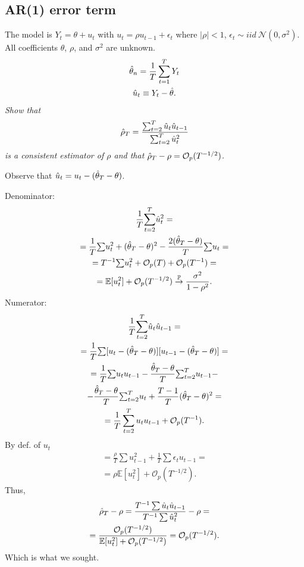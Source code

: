 \documentclass[9pt]{extarticle}
\newcommand{\PP}{\mathbb{P}}
\newcommand{\EE}{\mathbb{E}}
\newcommand{\OO}{\mathcal{O}}
\newcommand{\parrow}{\overset{\PP}{\rightarrow}}
\begin{document}
\begin{multicols*}{4}
\subsection*{AR(1) error term}
The model is $Y_t = \theta + u_t$ with $u_t = \rho u_{t-1} + \epsilon_t$ where $|\rho| < 1$, $\epsilon_t \sim iid ~\mathcal{N}(0, \sigma^2)$. All coefficients $\theta$, $\rho$, and $\sigma^2$ are unknown.
\begin{gather*}
    \hat{\theta}_n = \frac{1}{T}\sum_{t=1}^T Y_t \\
    \hat{u}_t \equiv Y_t - \hat{\theta}.
\end{gather*}
\emph{Show that}
\begin{gather*}
    \hat{\rho}_T = \frac{\sum_{t=2}^T \hat{u}_t \hat{u}_{t-1}}{\sum_{t=2}^T \hat{u}_t^2}
\end{gather*}
\emph{is a consistent estimator of $\rho$ and that $\hrho_T - \rho = \OO_p(T^{-1/2})$.}

Observe that $\hat{u}_t = u_t - (\hat{\theta}_T - \theta)$.

Denominator:
\begin{gather*}
    \frac{1}{T}{ \sum_{t=2}^T} \hu_t^2 = \\
    = \frac{1}{T}{\textstyle \sum} u_t^2 + (\htt_T - \theta)^2 - \frac{2(\htt_T - \theta)}{T}{\textstyle \sum} u_t = \\
    = T^{-1}{\textstyle \sum} u_t^2 + \OO_p(T)+  \OO_p(T^{-1}) = \\
    = \EE[u_t^2] + \OO_p(T^{-1/2}) \parrow \frac{\sigma^2}{1-\rho^2}.
\end{gather*}
Numerator:
\begin{gather*}
    \frac{1}{T}{ \sum_{t=2}^T} \hu_t \hu_{t-1} = \\
    = \frac{1}{T}{\textstyle \sum}[u_t - (\htt_T - \theta)][u_{t-1} - (\htt_T - \theta)] = \\
    = \frac{1}{T} {\textstyle \sum}u_t u_{t-1} - \frac{\htt_T - \theta}{T}{\textstyle \sum_{t=2}^T} u_{t-1} - \\
    - \frac{\htt_T - \theta}{T}{\textstyle \sum_{t=2}^T} u_{t} + \frac{T-1}{T}(\htt_T - \theta)^2 = \\
    = \frac{1}{T} \sum_{t=2}^T u_t u_{t-1} + \OO_p(T^{-1}).
\end{gather*}
By def. of $u_t$
\begin{gather*}
    = \frac{\rho}{T} {\textstyle \sum}u_{t-1}^2 + \frac{1}{T} {\textstyle \sum}\epsilon_t u_{t-1} = \\
    = \rho \EE[u_t^2] + \OO_p(T^{-1/2}).
\end{gather*}
Thus,
\begin{gather*}
    \hrho_T - \rho = \frac{T^{-1} \sum \hu_t \hu_{t-1}}{T^{-1} \sum \hu_t^2} - \rho = \\
    = \frac{\OO_p(T^{-1/2})}{\EE[u_t^2] + \OO_p(T^{-1/2})} = \OO_p(T^{-1/2}).
\end{gather*}
Which is what we sought.


\end{multicols*}
\end{document}
